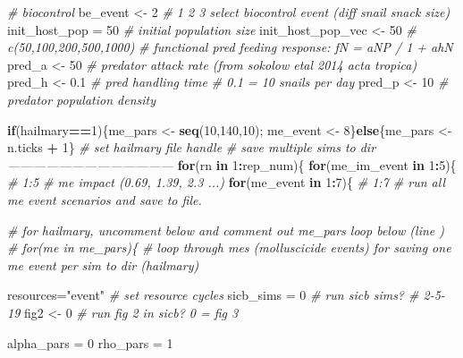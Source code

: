 \documentclass[10,portrait]{article}
\newenvironment{Shaded}{\begin{snugshade}}{\end{snugshade}}
\newcommand{\KeywordTok}[1]{\textcolor[rgb]{0.13,0.29,0.53}{\textbf{#1}}}
\newcommand{\DecValTok}[1]{\textcolor[rgb]{0.00,0.00,0.81}{#1}}
\newcommand{\FloatTok}[1]{\textcolor[rgb]{0.00,0.00,0.81}{#1}}
\newcommand{\StringTok}[1]{\textcolor[rgb]{0.31,0.60,0.02}{#1}}
\newcommand{\CommentTok}[1]{\textcolor[rgb]{0.56,0.35,0.01}{\textit{#1}}}
\newcommand{\ControlFlowTok}[1]{\textcolor[rgb]{0.13,0.29,0.53}{\textbf{#1}}}
\newcommand{\OperatorTok}[1]{\textcolor[rgb]{0.81,0.36,0.00}{\textbf{#1}}}
\newcommand{\NormalTok}[1]{#1}
\begin{document}
\begin{Shaded}
\begin{Highlighting}[]
{{\CommentTok{# biocontrol}
\NormalTok{be_event <-}\StringTok{ }\DecValTok{2} \CommentTok{# 1 2 3 select biocontrol event (diff snail snack size)}
\NormalTok{init_host_pop =}\StringTok{ }\DecValTok{50} \CommentTok{# initial population size}
\NormalTok{init_host_pop_vec <-}\StringTok{ }\DecValTok{50} \CommentTok{# c(50,100,200,500,1000)}
\CommentTok{# functional pred feeding response: fN = aNP / 1 + ahN}
\NormalTok{pred_a <-}\StringTok{ }\DecValTok{50} \CommentTok{# predator attack rate (from sokolow etal 2014 acta tropica)}
\NormalTok{pred_h <-}\StringTok{ }\FloatTok{0.1} \CommentTok{# pred handling time # 0.1 = 10 snails per day}
\NormalTok{pred_p <-}\StringTok{ }\DecValTok{10} \CommentTok{# predator population density}

\ControlFlowTok{if}\NormalTok{(hailmary}\OperatorTok{==}\DecValTok{1}\NormalTok{)\{me_pars <-}\StringTok{ }\KeywordTok{seq}\NormalTok{(}\DecValTok{10}\NormalTok{,}\DecValTok{140}\NormalTok{,}\DecValTok{10}\NormalTok{); me_event <-}\StringTok{ }\DecValTok{8}\NormalTok{\}}\ControlFlowTok{else}\NormalTok{\{me_pars <-}\StringTok{ }\NormalTok{n.ticks }\OperatorTok{+}\StringTok{ }\DecValTok{1}\NormalTok{\} }\CommentTok{# set hailmary file handle}
\CommentTok{#  save multiple sims to dir ---------------------------------------}
\ControlFlowTok{for}\NormalTok{(rn }\ControlFlowTok{in} \DecValTok{1}\OperatorTok{:}\NormalTok{rep_num)\{}
  \ControlFlowTok{for}\NormalTok{(me_im_event }\ControlFlowTok{in} \DecValTok{1}\OperatorTok{:}\DecValTok{5}\NormalTok{)\{ }\CommentTok{# 1:5 # me impact (0.69, 1.39, 2.3 ...)}
    \ControlFlowTok{for}\NormalTok{(me_event }\ControlFlowTok{in} \DecValTok{1}\OperatorTok{:}\DecValTok{7}\NormalTok{)\{ }\CommentTok{# 1:7 # run all me event scenarios and save to file.}
      
      \CommentTok{# for hailmary, uncomment below and comment out me_pars loop below (line ) }
      \CommentTok{# for(me in me_pars)\{ # loop through mes (molluscicide events) for saving one me event per sim to dir (hailmary)}
        
\NormalTok{        resources=}\StringTok{"event"} \CommentTok{# set resource cycles}
\NormalTok{        sicb_sims =}\StringTok{ }\DecValTok{0} \CommentTok{# run sicb sims? # 2-5-19}
\NormalTok{        fig2 <-}\StringTok{ }\DecValTok{0} \CommentTok{# run fig 2 in sicb? 0 = fig 3}
        
\NormalTok{        alpha_pars =}\StringTok{ }\DecValTok{0}
\NormalTok{        rho_pars =}\StringTok{ }\DecValTok{1}
        
}}
\end{Highlighting}
\end{Shaded}
\end{document}
